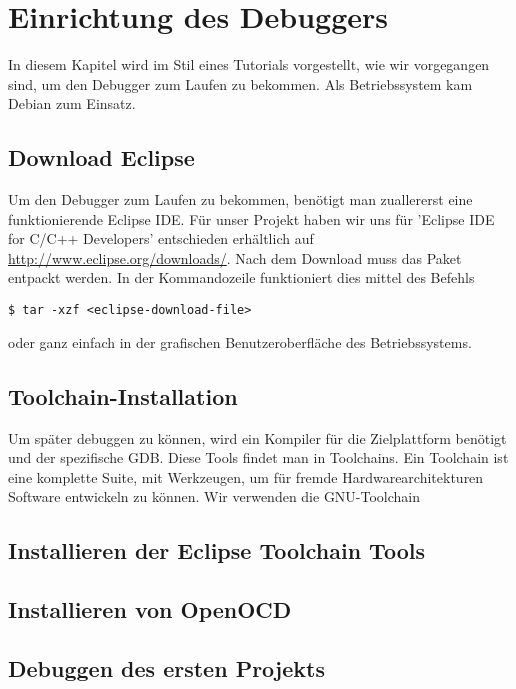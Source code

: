\documentclass[12pt,a4paper]{article}
\author{Jonathan Weißenberger}
\begin{document}
\section{Einrichtung des Debuggers}
In diesem Kapitel wird im Stil eines Tutorials vorgestellt, wie wir vorgegangen sind, um den Debugger zum Laufen zu bekommen. Als Betriebssystem kam Debian zum Einsatz.
\subsection{Download Eclipse}
Um den Debugger zum Laufen zu bekommen, benötigt man zuallererst eine funktionierende Eclipse IDE. Für unser Projekt haben wir uns für 'Eclipse IDE for C/C++ Developers' entschieden erhältlich auf \url{http://www.eclipse.org/downloads/}.
Nach dem Download muss das Paket entpackt werden. In der Kommandozeile funktioniert dies mittel des Befehls 
\begin{lstlisting} 
$ tar -xzf <eclipse-download-file>
\end{lstlisting}
oder ganz einfach in der grafischen Benutzeroberfläche des Betriebssystems.
\subsection{Toolchain-Installation}
Um später debuggen zu können, wird ein Kompiler für die Zielplattform benötigt und der spezifische GDB. Diese Tools findet man in Toolchains. Ein Toolchain ist eine komplette Suite, mit Werkzeugen, um für fremde Hardwarearchitekturen Software entwickeln zu können. 
Wir verwenden die GNU-Toolchain 
\subsection{Installieren der Eclipse Toolchain Tools}
\subsection{Installieren von OpenOCD}
\subsection{Debuggen des ersten Projekts}
\end{document}
